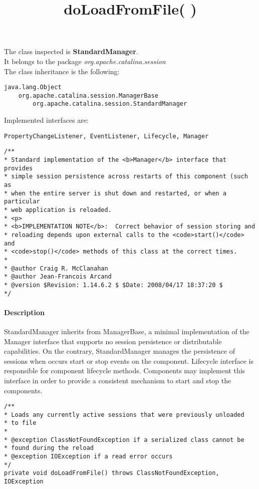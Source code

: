 The class inspected is \textbf{StandardManager}.\\It belongs to the package \textit{org.apache.catalina.session}\\
The class inheritance is the following:
\begin{verbatim}
java.lang.Object
    org.apache.catalina.session.ManagerBase
        org.apache.catalina.session.StandardManager
\end{verbatim}

Implemented interfaces are:
\begin{verbatim}
PropertyChangeListener, EventListener, Lifecycle, Manager
\end{verbatim}
\lstset{firstnumber=79}
\begin{lstlisting}
/**
* Standard implementation of the <b>Manager</b> interface that provides
* simple session persistence across restarts of this component (such as
* when the entire server is shut down and restarted, or when a particular
* web application is reloaded.
* <p>
* <b>IMPLEMENTATION NOTE</b>:  Correct behavior of session storing and
* reloading depends upon external calls to the <code>start()</code> and
* <code>stop()</code> methods of this class at the correct times.
*
* @author Craig R. McClanahan
* @author Jean-Francois Arcand
* @version $Revision: 1.14.6.2 $ $Date: 2008/04/17 18:37:20 $
*/
\end{lstlisting}
\paragraph{Description} StandardManager inherits from ManagerBase, a minimal implementation of the Manager interface that supports no session persistence or distributable capabilities. On the contrary, StandardManager manages the persistence of sessions when occurs start or stop events on the component. Lifecycle interface is responsible for component lifecycle methods. Components may implement this interface in order to provide a consistent mechanism to start and stop the components.\\




\title{{\large \textbf{doLoadFromFile( )}}}
\lstset{firstnumber=457}
\begin{lstlisting}
/**
* Loads any currently active sessions that were previously unloaded
* to file
*
* @exception ClassNotFoundException if a serialized class cannot be
* found during the reload
* @exception IOException if a read error occurs
*/
private void doLoadFromFile() throws ClassNotFoundException, IOException 
\end{lstlisting}

